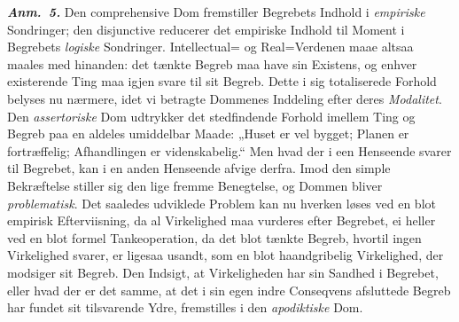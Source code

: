 \documentclass[12pt]{book}
\newcommand{\anm}[1]{\emph{\textbf{Anm.~#1.}}}
\newcommand{\opage}[1]{\marginnote{\footnotesize\textit{[#1]}}}
\begin{document}
\anm{5} Den comprehensive Dom fremstiller Begrebets Indhold i \emph{empiriske}
Sondringer; den disjunctive reducerer det empiriske Indhold til Moment i
Begrebets \emph{logiske} Sondringer. Intellectual= og Real=Verdenen maae altsaa
maales med hinanden: det tænkte Begreb maa have sin Existens, og enhver
existerende Ting maa igjen svare til sit Begreb. Dette i sig totaliserede
Forhold belyses nu nærmere, idet vi betragte Dommenes Inddeling efter deres
\emph{Modalitet}. Den \emph{assertoriske} Dom udtrykker det stedfindende Forhold
imellem Ting og Begreb paa en aldeles umiddelbar Maade: „Huset er vel bygget;
Planen er fortræffelig; Afhandlingen er videnskabelig.“ Men hvad der i een
Henseende svarer til Begrebet, kan i en anden Henseende afvige derfra. Imod den
simple Bekræftelse stiller sig den lige%
\opage{54}%
fremme Benegtelse, og Dommen bliver \emph{problematisk}. Det saaledes udviklede
Problem kan nu hverken løses ved en blot empirisk Efterviisning, da al Virkelighed
maa vurderes efter Begrebet, ei heller ved en blot formel Tankeoperation, da det
blot tænkte Begreb, hvortil ingen Virkelighed svarer, er ligesaa usandt, som en
blot haandgribelig Virkelighed, der modsiger sit Begreb. Den Indsigt, at
Virkeligheden har sin Sandhed i Begrebet, eller hvad der er det samme, at det i
sin egen indre Conseqvens afsluttede Begreb har fundet sit tilsvarende Ydre,
fremstilles i den \emph{apodiktiske} Dom.
\end{document}
